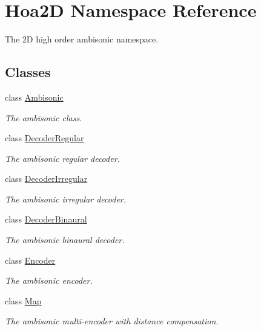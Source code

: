 \hypertarget{namespace_hoa2_d}{\section{Hoa2\-D Namespace Reference}
\label{namespace_hoa2_d}
}


The 2\-D high order ambisonic namespace.  


\subsection*{Classes}
\begin{DoxyCompactItemize}
\item 
class \hyperlink{class_hoa2_d_1_1_ambisonic}{Ambisonic}
\begin{DoxyCompactList}\small\item\em The ambisonic class. \end{DoxyCompactList}\item 
class \hyperlink{class_hoa2_d_1_1_decoder_regular}{Decoder\-Regular}
\begin{DoxyCompactList}\small\item\em The ambisonic regular decoder. \end{DoxyCompactList}\item 
class \hyperlink{class_hoa2_d_1_1_decoder_irregular}{Decoder\-Irregular}
\begin{DoxyCompactList}\small\item\em The ambisonic irregular decoder. \end{DoxyCompactList}\item 
class \hyperlink{class_hoa2_d_1_1_decoder_binaural}{Decoder\-Binaural}
\begin{DoxyCompactList}\small\item\em The ambisonic binaural decoder. \end{DoxyCompactList}\item 
class \hyperlink{class_hoa2_d_1_1_encoder}{Encoder}
\begin{DoxyCompactList}\small\item\em The ambisonic encoder. \end{DoxyCompactList}\item 
class \hyperlink{class_hoa2_d_1_1_map}{Map}
\begin{DoxyCompactList}\small\item\em The ambisonic multi-\/encoder with distance compensation. \end{DoxyCompactList}\item 

\end{DoxyCompactItemize}
